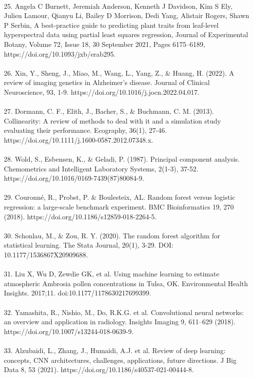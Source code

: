 \documentclass[12pt,a4paper]{report}
\begin{document}
\\
25. Angela C Burnett, Jeremiah Anderson, Kenneth J Davidson, Kim S Ely, Julien Lamour, Qianyu Li, Bailey D Morrison, Dedi Yang, Alistair Rogers, Shawn P Serbin, A best-practice guide to predicting plant traits from leaf-level hyperspectral data using partial least squares regression, Journal of Experimental Botany, Volume 72, Issue 18, 30 September 2021, Pages 6175–6189, https://doi.org/10.1093/jxb/erab295. \\
\\
26. Xin, Y., Sheng, J., Miao, M., Wang, L., Yang, Z., \& Huang, H. (2022). A review of imaging genetics in Alzheimer's disease. Journal of Clinical Neuroscience, 93, 1-9. https://doi.org/10.1016/j.jocn.2022.04.017. \\
\\
27. Dormann, C. F., Elith, J., Bacher, S., \& Buchmann, C. M. (2013). Collinearity: A review of methods to deal with it and a simulation study evaluating their performance. Ecography, 36(1), 27-46. https://doi.org/10.1111/j.1600-0587.2012.07348.x. \\
\\
28. Wold, S., Esbensen, K., \& Geladi, P. (1987). Principal component analysis. Chemometrics and Intelligent Laboratory Systems, 2(1-3), 37-52. https://doi.org/10.1016/0169-7439(87)80084-9. \\
\\
29. Couronné, R., Probst, P. \& Boulesteix, AL. Random forest versus logistic regression: a large-scale benchmark experiment. BMC Bioinformatics 19, 270 (2018). https://doi.org/10.1186/s12859-018-2264-5.\\
\\
30. Schonlau, M., \& Zou, R. Y. (2020). The random forest algorithm for statistical learning. The Stata Journal, 20(1), 3-29. DOI: 10.1177/1536867X20909688. \\
\\
31. Liu X, Wu D, Zewdie GK, et al. Using machine learning to estimate atmospheric Ambrosia pollen concentrations in Tulsa, OK. Environmental Health Insights. 2017;11. doi:10.1177/1178630217699399. \\
\\
32. Yamashita, R., Nishio, M., Do, R.K.G. et al. Convolutional neural networks: an overview and application in radiology. Insights Imaging 9, 611–629 (2018). https://doi.org/10.1007/s13244-018-0639-9.\\
\\
33. Alzubaidi, L., Zhang, J., Humaidi, A.J. et al. Review of deep learning: concepts, CNN architectures, challenges, applications, future directions. J Big Data 8, 53 (2021). https://doi.org/10.1186/s40537-021-00444-8. \\
\end{document}
